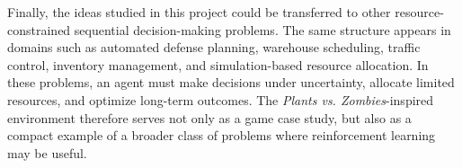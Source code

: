 \documentclass[conference,onecolumn]{IEEEtran}
\begin{document}

Finally, the ideas studied in this project could be transferred to other resource-constrained sequential decision-making problems. The same structure appears in domains such as automated defense planning, warehouse scheduling, traffic control, inventory management, and simulation-based resource allocation. In these problems, an agent must make decisions under uncertainty, allocate limited resources, and optimize long-term outcomes. The \textit{Plants vs. Zombies}-inspired environment therefore serves not only as a game case study, but also as a compact example of a broader class of problems where reinforcement learning may be useful.



\end{document}
